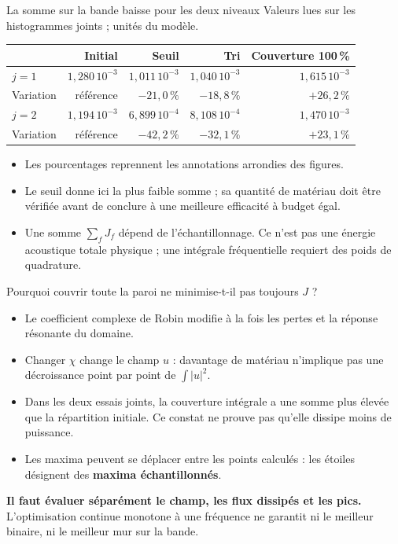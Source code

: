 \begin{frame}{La somme sur la bande baisse pour les deux niveaux}
\small Valeurs lues sur les histogrammes joints ; unités du modèle.
\begin{center}
\begin{tabular}{lrrrr}
\toprule & Initial & Seuil & Tri & Couverture 100\,\%\\
\midrule $j=1$ & $1{,}280\,10^{-3}$ & $1{,}011\,10^{-3}$ & $1{,}040\,10^{-3}$ & $1{,}615\,10^{-3}$\\
Variation & référence & $-21{,}0\,\%$ & $-18{,}8\,\%$ & $+26{,}2\,\%$\\
\addlinespace
$j=2$ & $1{,}194\,10^{-3}$ & $6{,}899\,10^{-4}$ & $8{,}108\,10^{-4}$ & $1{,}470\,10^{-3}$\\
Variation & référence & $-42{,}2\,\%$ & $-32{,}1\,\%$ & $+23{,}1\,\%$\\\bottomrule
\end{tabular}
\end{center}
\begin{itemize}
\item Les pourcentages reprennent les annotations arrondies des figures.
\item Le seuil donne ici la plus faible somme ; sa quantité de matériau doit être vérifiée avant de conclure à une meilleure efficacité à budget égal.
\item Une somme $\sum_f J_f$ dépend de l'échantillonnage. Ce n'est pas une énergie acoustique totale physique ; une intégrale fréquentielle requiert des poids de quadrature.
\end{itemize}
\end{frame}

\begin{frame}{Pourquoi couvrir toute la paroi ne minimise-t-il pas toujours $J$ ?}
\begin{itemize}
\item Le coefficient complexe de Robin modifie à la fois les pertes et la réponse résonante du domaine.
\item Changer $\chi$ change le champ $u$ : davantage de matériau n'implique pas une décroissance point par point de $\int|u|^2$.
\item Dans les deux essais joints, la couverture intégrale a une somme plus élevée que la répartition initiale. Ce constat ne prouve pas qu'elle dissipe moins de puissance.
\item Les maxima peuvent se déplacer entre les points calculés : les étoiles désignent des \textbf{maxima échantillonnés}.
\end{itemize}
\medskip
\textbf{Il faut évaluer séparément le champ, les flux dissipés et les pics.}
L'optimisation continue monotone à une fréquence ne garantit ni le meilleur binaire, ni le meilleur mur sur la bande.
\end{frame}

